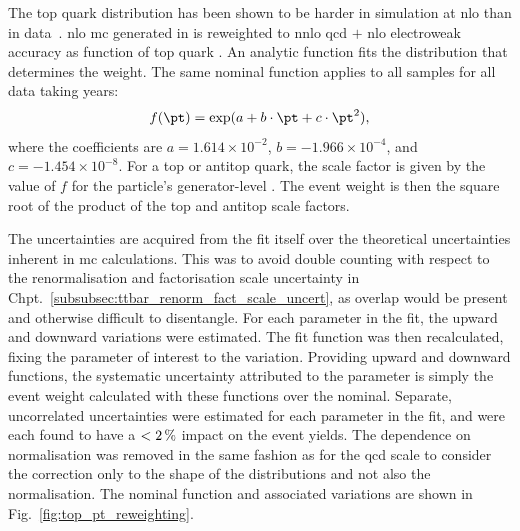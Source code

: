 The top quark \pt distribution has been shown to be harder in simulation at \acrshort{nlo} than in data~\cite{Sirunyan:2018ucr}. \acrshort{nlo} \ttbarpjets \acrshort{mc} generated in \POWHEG is reweighted to \acrshort{nnlo} \acrshort{qcd} $+$ \acrshort{nlo} electroweak accuracy as function of top quark \pt. An analytic function fits the distribution that determines the weight. The same nominal function applies to all \ttbarpjets samples for all data taking years:
\begin{equation}
    f(\pt) = \exp(a + b \cdot \pt + c \cdot \pt^2),
\end{equation}
where the coefficients are $a = \text{1.614} \times \text{10}^{-2}$, $b = -\text{1.966} \times \text{10}^{-4}$, and $c = -\text{1.454} \times \text{10}^{-8}$. For a top or antitop quark, the scale factor is given by the value of $f$ for the particle's generator-level \pt. The event weight is then the square root of the product of the top and antitop scale factors.

The uncertainties are acquired from the fit itself over the theoretical uncertainties inherent in \acrshort{mc} calculations. This was to avoid double counting with respect to the renormalisation and factorisation scale uncertainty in Chpt.~\ref{subsubsec:ttbar_renorm_fact_scale_uncert}, as overlap would be present and otherwise difficult to disentangle. For each parameter in the fit, the upward and downward variations were estimated. The fit function was then recalculated, fixing the parameter of interest to the variation. Providing upward and downward functions, the systematic uncertainty attributed to the parameter is simply the event weight calculated with these functions over the nominal. Separate, uncorrelated uncertainties were estimated for each parameter in the fit, and were each found to have a $< \text{2\,\%}$ impact on the event yields. The dependence on normalisation was removed in the same fashion as for the \acrshort{qcd} scale to consider the correction only to the shape of the distributions and not also the normalisation. The nominal function and associated variations are shown in Fig.~\ref{fig:top_pt_reweighting}.

\clearpage

